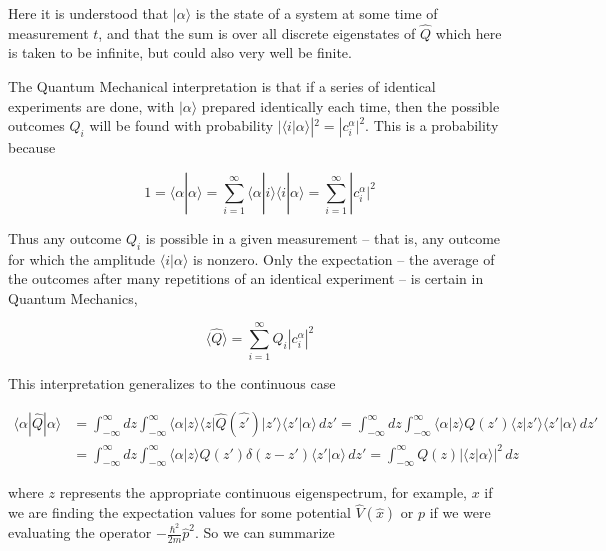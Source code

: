 Here it is understood that $| \alpha \rangle$ is the state of a system at some
time of measurement $t$, and that the sum is over all discrete eigenstates of
$\hat{Q}$ which here is taken to be infinite, but could also very well be
finite. 

The Quantum Mechanical interpretation is that if a series of identical
experiments are done, with $|\alpha\rangle$ prepared identically each time,
then the possible outcomes $Q_i$ will be found with probability $|\langle
i | \alpha \rangle | ^2 = |c_i^\alpha|^2$. This is a probability because 

\[
1 = \langle \alpha | \alpha \rangle = \sum_{i=1}^{\infty} \langle \alpha
  | i\rangle \langle i | \alpha \rangle  = \sum_{i=1}^{\infty} |c_i^\alpha |^2 
\] \vspace{3px}

Thus any outcome $Q_i$ is possible in a given measurement -- that is, any
outcome for which the amplitude $\langle i | \alpha \rangle$ is nonzero. Only
the expectation -- the average of the outcomes after many repetitions of an
identical experiment -- is certain in Quantum Mechanics, 

\[
\langle \hat{Q} \rangle = \sum_{i=1}^{\infty}  Q_i |c_i^\alpha | ^2
\] \vspace{3px}

This interpretation generalizes to the continuous case

\begin{align} \label{}
  \langle \alpha | \hat{Q} | \alpha \rangle &= \int_{-\infty}^{\infty} dz
  \int_{-\infty}^{\infty} \langle \alpha | z \rangle \langle
  z | \hat{Q}(\hat{z'})| z' \rangle \langle z' | \alpha \rangle \, dz'
  = \int_{-\infty}^{\infty}  dz \int_{-\infty}^{\infty}  \langle \alpha
  | z \rangle Q(z') \langle z | z' \rangle \langle z' | \alpha \rangle \, dz'
  \\
  &= \int_{-\infty}^{\infty} dz \int_{-\infty}^{\infty} \langle \alpha
  | z \rangle Q(z') \delta(z- z') \langle z' | \alpha \rangle \, dz'
  = \int_{-\infty}^{\infty} Q(z) | \langle z | \alpha \rangle |^2 \, dz
\end{align}\vspace{3px}

where $z$ represents the appropriate continuous eigenspectrum, for example, $x$
if we are finding the expectation values for some potential $\hat{V}(\hat{x})$
or $ p$ if we were evaluating the operator $-\frac{\hbar^2}{2m}\hat{p}^2$. So
we can summarize 



